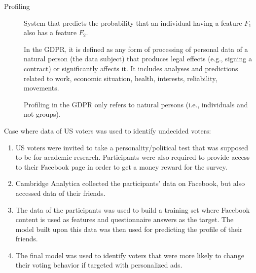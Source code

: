 \begin{description}
    \item[Profiling]   
        System that predicts the probability that an individual having a feature $F_1$ also has a feature $F_2$.

        In the GDPR, it is defined as any form of processing of personal data of a natural person (the data subject) that produces legal effects (e.g., signing a contract) or significantly affects it. It includes analyses and predictions related to work, economic situation, health, interests, reliability, movements.

        \begin{remark}
            Profiling in the GDPR only refers to natural persons (i.e., individuals and not groups).
        \end{remark}
\end{description}


\begin{example}
    Case where data of US voters was used to identify undecided voters:
    \begin{enumerate}
        \item US voters were invited to take a personality/political test that was supposed to be for academic research. Participants were also required to provide access to their Facebook page in order to get a money reward for the survey.
        \item Cambridge Analytica collected the participants' data on Facebook, but also accessed data of their friends.
        \item The data of the participants was used to build a training set where Facebook content is used as features and questionnaire answers as the target. The model built upon this data was then used for predicting the profile of their friends.
        \item The final model was used to identify voters that were more likely to change their voting behavior if targeted with personalized ads.
    \end{enumerate}
\end{example}

